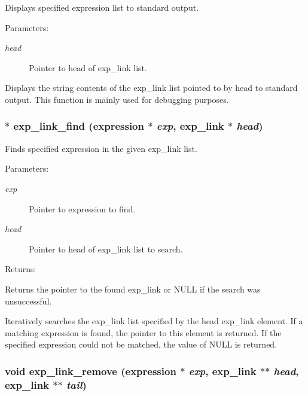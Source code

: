 Displays specified expression list to standard output.

\begin{Desc}
\item[Parameters: ]\par
\begin{description}
\item[{\em 
head}]Pointer to head of exp\_\-link list.\end{description}
\end{Desc}
Displays the string contents of the exp\_\-link list pointed to by head to standard output. This function is mainly used for debugging purposes. 
\subsubsection{$\ast$ exp\_\-link\_\-find ({\bf expression} $\ast$ {\em exp}, {\bf exp\_\-link} $\ast$ {\em head})}\label{link_8c_a13}


Finds specified expression in the given exp\_\-link list.

\begin{Desc}
\item[Parameters: ]\par
\begin{description}
\item[{\em 
exp}]Pointer to expression to find. \item[{\em 
head}]Pointer to head of exp\_\-link list to search.\end{description}
\end{Desc}
\begin{Desc}
\item[Returns: ]\par
Returns the pointer to the found exp\_\-link or NULL if the search was unsuccessful.\end{Desc}
Iteratively searches the exp\_\-link list specified by the head exp\_\-link element. If a matching expression is found, the pointer to this element is returned. If the specified expression could not be matched, the value of NULL is returned. 
\subsubsection{\setlength{\rightskip}{0pt plus 5cm}void exp\_\-link\_\-remove ({\bf expression} $\ast$ {\em exp}, {\bf exp\_\-link} $\ast$$\ast$ {\em head}, {\bf exp\_\-link} $\ast$$\ast$ {\em tail})}\label{link_8c_a16}


